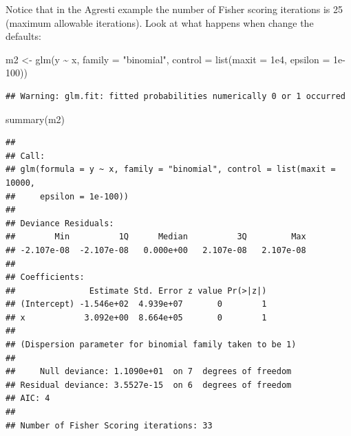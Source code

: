 \documentclass[
  ignorenonframetext,
]{beamer}
\newenvironment{Shaded}{\begin{snugshade}}{\end{snugshade}}
\newcommand{\AttributeTok}[1]{\textcolor[rgb]{0.77,0.63,0.00}{#1}}
\newcommand{\FloatTok}[1]{\textcolor[rgb]{0.00,0.00,0.81}{#1}}
\newcommand{\FunctionTok}[1]{\textcolor[rgb]{0.00,0.00,0.00}{#1}}
\newcommand{\NormalTok}[1]{#1}
\newcommand{\OtherTok}[1]{\textcolor[rgb]{0.56,0.35,0.01}{#1}}
\newcommand{\SpecialCharTok}[1]{\textcolor[rgb]{0.00,0.00,0.00}{#1}}
\newcommand{\StringTok}[1]{\textcolor[rgb]{0.31,0.60,0.02}{#1}}
\begin{document}
\begin{frame}[fragile]{}
\protect\hypertarget{section-5}{}
Notice that in the Agresti example the number of Fisher scoring
iterations is 25 (maximum allowable iterations). Look at what happens
when change the defaults:

\vspace{12pt}
\tiny

\begin{Shaded}
\begin{Highlighting}[]
\NormalTok{m2 }\OtherTok{\textless{}{-}} \FunctionTok{glm}\NormalTok{(y }\SpecialCharTok{\textasciitilde{}}\NormalTok{ x, }\AttributeTok{family =} \StringTok{"binomial"}\NormalTok{, }
          \AttributeTok{control =} \FunctionTok{list}\NormalTok{(}\AttributeTok{maxit =} \FloatTok{1e4}\NormalTok{, }\AttributeTok{epsilon =} \FloatTok{1e{-}100}\NormalTok{))}
\end{Highlighting}
\end{Shaded}

\begin{verbatim}
## Warning: glm.fit: fitted probabilities numerically 0 or 1 occurred
\end{verbatim}

\begin{Shaded}
\begin{Highlighting}[]
\FunctionTok{summary}\NormalTok{(m2)}
\end{Highlighting}
\end{Shaded}

\begin{verbatim}
## 
## Call:
## glm(formula = y ~ x, family = "binomial", control = list(maxit = 10000, 
##     epsilon = 1e-100))
## 
## Deviance Residuals: 
##        Min          1Q      Median          3Q         Max  
## -2.107e-08  -2.107e-08   0.000e+00   2.107e-08   2.107e-08  
## 
## Coefficients:
##               Estimate Std. Error z value Pr(>|z|)
## (Intercept) -1.546e+02  4.939e+07       0        1
## x            3.092e+00  8.664e+05       0        1
## 
## (Dispersion parameter for binomial family taken to be 1)
## 
##     Null deviance: 1.1090e+01  on 7  degrees of freedom
## Residual deviance: 3.5527e-15  on 6  degrees of freedom
## AIC: 4
## 
## Number of Fisher Scoring iterations: 33
\end{verbatim}
\end{frame}
\end{document}
